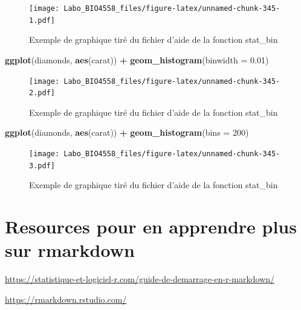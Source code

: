 \documentclass[
  12pt,
]{book}
\newenvironment{Shaded}{\begin{snugshade}}{\end{snugshade}}
\newcommand{\DataTypeTok}[1]{\textcolor[rgb]{0.13,0.29,0.53}{#1}}
\newcommand{\DecValTok}[1]{\textcolor[rgb]{0.00,0.00,0.81}{#1}}
\newcommand{\FloatTok}[1]{\textcolor[rgb]{0.00,0.00,0.81}{#1}}
\newcommand{\KeywordTok}[1]{\textcolor[rgb]{0.13,0.29,0.53}{\textbf{#1}}}
\newcommand{\NormalTok}[1]{#1}
\newcommand{\OperatorTok}[1]{\textcolor[rgb]{0.81,0.36,0.00}{\textbf{#1}}}
\newcommand{\StringTok}[1]{\textcolor[rgb]{0.31,0.60,0.02}{#1}}
\begin{document}
\begin{figure}
\centering
\texttt{[image: Labo\_BIO4558\_files/figure-latex/unnamed-chunk-345-1.pdf]}
\caption{\label{fig:unnamed-chunk-345-1}Exemple de graphique tiré du fichier d'aide de la fonction stat\_bin}
\end{figure}

\begin{Shaded}
\begin{Highlighting}[]
\KeywordTok{ggplot}\NormalTok{(diamonds, }\KeywordTok{aes}\NormalTok{(carat)) }\OperatorTok{+}
\StringTok{  }\KeywordTok{geom\_histogram}\NormalTok{(}\DataTypeTok{binwidth =} \FloatTok{0.01}\NormalTok{)}
\end{Highlighting}
\end{Shaded}

\begin{figure}
\centering
\texttt{[image: Labo\_BIO4558\_files/figure-latex/unnamed-chunk-345-2.pdf]}
\caption{\label{fig:unnamed-chunk-345-2}Exemple de graphique tiré du fichier d'aide de la fonction stat\_bin}
\end{figure}

\begin{Shaded}
\begin{Highlighting}[]
\KeywordTok{ggplot}\NormalTok{(diamonds, }\KeywordTok{aes}\NormalTok{(carat)) }\OperatorTok{+}
\StringTok{  }\KeywordTok{geom\_histogram}\NormalTok{(}\DataTypeTok{bins =} \DecValTok{200}\NormalTok{)}
\end{Highlighting}
\end{Shaded}

\begin{figure}
\centering
\texttt{[image: Labo\_BIO4558\_files/figure-latex/unnamed-chunk-345-3.pdf]}
\caption{\label{fig:unnamed-chunk-345-3}Exemple de graphique tiré du fichier d'aide de la fonction stat\_bin}
\end{figure}

\hypertarget{resources-pour-en-apprendre-plus-sur-rmarkdown}{%
\chapter{Resources pour en apprendre plus sur rmarkdown}\label{resources-pour-en-apprendre-plus-sur-rmarkdown}}

\url{https://statistique-et-logiciel-r.com/guide-de-demarrage-en-r-markdown/}

\url{https://rmarkdown.rstudio.com/}

\printindex
\end{document}
